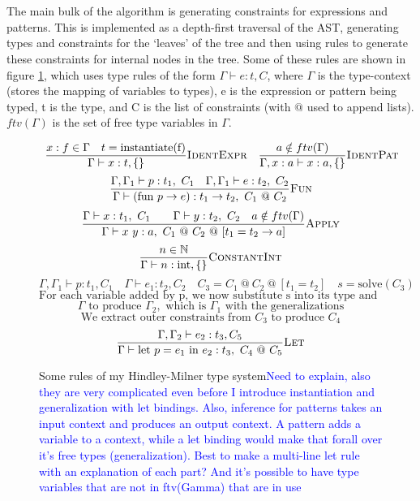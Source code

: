 \documentclass[12pt,twoside,notitlepage]{report}
\newcommand\note[1]{\textcolor{blue}{#1}}
\begin{document}
\\\\
The main bulk of the algorithm is generating constraints for expressions and patterns. This is implemented as a depth-first traversal of the AST, generating types and constraints for the `leaves' of the tree and then using rules to generate these constraints for internal nodes in the tree. Some of these rules are shown in figure \ref{fig:typerules}, which uses type rules of the form $\Gamma \vdash e : t, C$, where $\Gamma$ is the type-context (stores the mapping of variables to types), e is the expression or pattern being typed, t is the type, and C is the list of constraints (with $@$ used to append lists). $ftv(\Gamma)$ is the set of free type variables in $\Gamma$.
\begin{figure}
	$$\begin{array}{cc}
	\dfrac{x : f \in \Gamma \quad t = \text{instantiate(f)}}{\Gamma \vdash x : t, \{\}} \textsc{IdentExpr} &
	\dfrac{a \notin ftv(\Gamma)}{\Gamma, x : a \vdash x : a, \{\}} \textsc{IdentPat}
	\end{array}$$
	$$\dfrac{\Gamma,\Gamma_1 \vdash p : t_1,\ C_1 \quad \Gamma, \Gamma_1 \vdash e : t_2,\ C_2}{\Gamma \vdash (\text{fun}\ p \rightarrow e) : t_1 \rightarrow t_2,\ C_1\ @\ C_2} \textsc{Fun}$$
	$$\dfrac{\Gamma \vdash x : t_1,\ C_1 \qquad \Gamma \vdash y : t_2,\ C_2 \quad a \notin ftv(\Gamma)}{\Gamma \vdash x\ y : a,\ C_1\ @\  C_2 \ @\  [t_1 = t_2 \rightarrow a]} \textsc{Apply}$$
	$$\dfrac{n \in \mathbb{N}}{\Gamma \vdash n : \text{int}, \{\}} \textsc{ConstantInt}$$
	$$\Gamma, \Gamma_1 \vdash p : t_1, C_1 \quad \Gamma \vdash e_1 : t_2, C_2 \quad C_3 = C_1\ @\ C_2\ @\ [t_1 = t_2] \quad s = \text{solve}(C_3)$$
	$$\text{For each variable added by p, we now substitute s into its type and generalize it over }$$
	$$ \Gamma \text{ to produce } \Gamma_2, \text{ which is } \Gamma_1 \text{ with the generalizations}$$
	$$\text{We extract outer constraints from } C_3 \text{ to produce } C_4$$
	$$\dfrac{\Gamma, \Gamma_2 \vdash e_2 : t_3, C_5}{\Gamma \vdash \text{let}\ p = e_1\ \text{in}\ e_2 : t_3,\ C_4\ @\ C_5} \textsc{Let}$$
	\caption{Some rules of my Hindley-Milner type system\note{Need to explain, also they are very complicated even before I introduce instantiation and generalization with let bindings. Also, inference for patterns takes an input context and produces an output context. A pattern adds a variable to a context, while a let binding would make that forall over it's free types (generalization). Best to make a multi-line let rule with an explanation of each part? And it's possible to have type variables that are not in ftv(Gamma) that are in use}}
	\label{fig:typerules}
\end{figure}
\end{document}
